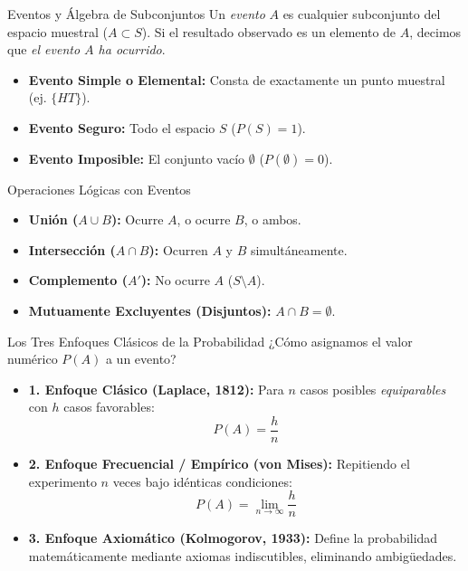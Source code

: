 \documentclass[10pt,aspectratio=169]{beamer}
\begin{document}
\begin{frame}{Eventos y Álgebra de Subconjuntos}
  \small Un \emph{evento} $A$ es cualquier subconjunto del espacio muestral ($A \subset S$). Si el resultado observado es un elemento de $A$, decimos que \emph{el evento $A$ ha ocurrido}. \pause

  \vspace{0.1em}
  \begin{itemize}\itemsep=0.1em
    \item \textbf{Evento Simple o Elemental:} Consta de exactamente un punto muestral (ej. $\{HT\}$). \pause
    \item \textbf{Evento Seguro:} Todo el espacio $S$ ($P(S) = 1$). \pause
    \item \textbf{Evento Imposible:} El conjunto vacío $\emptyset$ ($P(\emptyset) = 0$).
  \end{itemize}

  \vspace{0.1em}
  \pause
  \begin{block}{Operaciones Lógicas con Eventos}
    \begin{itemize}\itemsep=0.1em
      \item \textbf{Unión ($A \cup B$):} Ocurre $A$, o ocurre $B$, o ambos.
      \item \textbf{Intersección ($A \cap B$):} Ocurren $A$ y $B$ simultáneamente.
      \item \textbf{Complemento ($A'$):} No ocurre $A$ ($S \setminus A$).
      \item \textbf{Mutuamente Excluyentes (Disjuntos):} $A \cap B = \emptyset$.
    \end{itemize}
  \end{block}
\end{frame}

\begin{frame}{Los Tres Enfoques Clásicos de la Probabilidad}
  \footnotesize ¿Cómo asignamos el valor numérico $P(A)$ a un evento? \pause

  \vspace{0.1em}
  \begin{itemize}\itemsep=0.2em
    \item \textbf{1. Enfoque Clásico (Laplace, 1812):} Para $n$ casos posibles \emph{equiparables} con $h$ casos favorables:
    $$P(A) = \frac{h}{n}$$ \pause
    \item \textbf{2. Enfoque Frecuencial / Empírico (von Mises):} Repitiendo el experimento $n$ veces bajo idénticas condiciones:
    $$P(A) = \lim_{n \to \infty} \frac{h}{n}$$ \pause
    \item \textbf{3. Enfoque Axiomático (Kolmogorov, 1933):} Define la probabilidad matemáticamente mediante axiomas indiscutibles, eliminando ambigüedades.
  \end{itemize}
\end{frame}
\end{document}
